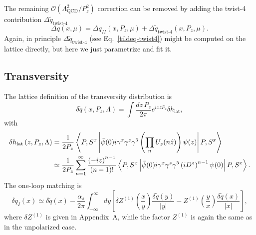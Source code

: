 The remaining $\mathcal{O}\left(\Lambda_\text{QCD}^2/P_z^2\right)$ correction can be removed by adding the twist-4 contribution $\Delta \tilde{q}_\text{twist-4}$
%
\begin{equation}
\Delta q(x,\mu) = 
  \Delta q_{II}(x,P_z,\mu) + \Delta\tilde{q}_\text{twist-4}(x,P_z,\mu).
\end{equation}
%
Again, in principle $\Delta \tilde{q}_\text{twist-4}$ (see Eq.~\ref{tildeq-twist4}) might be computed on the lattice
directly, but here we just parametrize and fit it.

\subsection{Transversity}

The lattice definition of the transversity distribution is
%
\begin{equation}
\delta \widetilde{q}(x,P_z,\Lambda) =
  \int \frac{dz\,P_z}{2\pi} e^{ixzP_z} \delta h_\text{lat},
\end{equation}
%
with 
%
\begin{align}
\delta h_\text{lat}\left(z,P_z,\Lambda \right) &= \frac{1}{2P_z}
  \left\langle P,S^x\left\vert
  \bar{\psi}(0) i\gamma^x\gamma^z\gamma^5\left(\prod_n U_z(n\hat{z})\right) \psi(z)
  \right\vert P,S^x\right\rangle   \notag \\
&\simeq \frac{1}{2P_z} \sum_{n=1}^\infty
  \frac{\left(-iz\right) ^{n-1}}{\left(n-1\right)!}
  \left\langle P,S^x\left\vert
  \bar{\psi}(0)i\gamma^x\gamma^z\gamma^5\left(iD^z\right)^{n-1}\psi(0)
  \right\vert P,S^x\right\rangle .  \label{deltah}
\end{align}
%
The one-loop matching is
%
\begin{equation}
\delta q_I(x) \simeq \delta \widetilde{q}(x) -
  \frac{\alpha_s}{2\pi} \int_{-\infty}^\infty\!dy
    \left[ \delta Z^{(1)}\!\!\left(\frac{x}{y}\right)
      \frac{\delta \widetilde{q}(y)}{\left\vert y\right\vert}
      - Z^{(1)}\!\!\left(\frac{y}{x}\right)
      \frac{\delta \widetilde{q}(x)}{\left\vert x\right\vert}\right] ,
\end{equation}
%
where $\delta Z^{(1)}$ is given in Appendix~A, while the factor $Z^{(1)}$ is again the same as in the unpolarized case.

